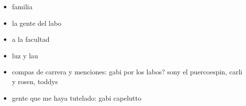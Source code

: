\begin{itemize}
    \item familia 
    \item la gente del labo
    \item a la facultad
    \item luz y lau
    \item compas de carrera y menciones: gabi por los labos? sony el puercoespin, carli y rosen, toddys
    \item gente que me haya tutelado: gabi capelutto 
\end{itemize}